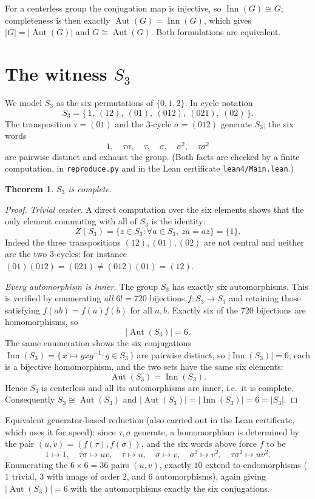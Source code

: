 \documentclass[11pt]{article}
\newtheorem{theorem}{Theorem}
\theoremstyle{definition}
\theoremstyle{remark}
\newcommand{\Aut}{\operatorname{Aut}}
\newcommand{\Inn}{\operatorname{Inn}}
\newcommand{\Sthree}{S_3}
\begin{document}
For a centerless group the conjugation map is injective, so $\Inn(G) \cong G$;
completeness is then exactly $\Aut(G) = \Inn(G)$, which gives
$|G| = |\Aut(G)|$ and $G \cong \Aut(G)$. Both formulations are equivalent.

\section{The witness $S_3$}

We model $\Sthree$ as the six permutations of $\{0,1,2\}$. In cycle notation
\[
\Sthree = \{\, 1,\ (12),\ (01),\ (012),\ (021),\ (02) \,\}.
\]
The transposition $\tau = (01)$ and the $3$-cycle $\sigma = (012)$ generate
$\Sthree$; the six words
\[
1,\quad \tau\sigma,\quad \tau,\quad \sigma,\quad \sigma^2,\quad \tau\sigma^2
\]
are pairwise distinct and exhaust the group. (Both facts are checked by a finite
computation, in \texttt{reproduce.py} and in the Lean certificate
\texttt{lean4/Main.lean}.)

\begin{theorem}\label{thm:complete}
$\Sthree$ is complete.
\end{theorem}

\begin{proof}
\emph{Trivial center.} A direct computation over the six elements shows that the
only element commuting with all of $\Sthree$ is the identity:
\[
Z(\Sthree) = \{z \in \Sthree : \forall a \in \Sthree,\ za = az\} = \{1\}.
\]
Indeed the three transpositions $(12),(01),(02)$ are not central and neither are
the two $3$-cycles: for instance $(01)(012) = (021) \neq (012)(01) = (12)$.

\emph{Every automorphism is inner.} The group $\Sthree$ has exactly six
automorphisms. This is verified by enumerating \emph{all} $6! = 720$ bijections
$f : \Sthree \to \Sthree$ and retaining those satisfying
$f(ab) = f(a)f(b)$ for all $a,b$. Exactly six of the $720$ bijections are
homomorphisms, so
\[
|\Aut(\Sthree)| = 6 .
\]
The same enumeration shows the six conjugations
$\Inn(\Sthree) = \{\, x \mapsto gxg^{-1} : g \in \Sthree \,\}$ are pairwise
distinct, so $|\Inn(\Sthree)| = 6$; each is a bijective homomorphism, and the two
sets have the same six elements:
\[
\Aut(\Sthree) = \Inn(\Sthree).
\]
Hence $\Sthree$ is centerless and all its automorphisms are inner, i.e.\ it is
complete. Consequently $\Sthree \cong \Aut(\Sthree)$ and
$|\Aut(\Sthree)| = |\Inn(\Sthree)| = 6 = |\Sthree|$.
\end{proof}

Equivalent generator-based reduction (also carried out in the Lean certificate,
which uses it for speed): since $\tau,\sigma$ generate, a homomorphism is
determined by the pair $(u,v) = (f(\tau), f(\sigma))$, and the six words above
force $f$ to be
\[
1 \mapsto 1,\quad \tau\sigma \mapsto uv,\quad \tau \mapsto u,\quad
\sigma \mapsto v,\quad \sigma^2 \mapsto v^2,\quad \tau\sigma^2 \mapsto uv^2 .
\]
Enumerating the $6 \times 6 = 36$ pairs $(u,v)$, exactly $10$ extend to
endomorphisms ($1$ trivial, $3$ with image of order $2$, and $6$ automorphisms),
again giving $|\Aut(\Sthree)| = 6$ with the automorphisms exactly the six
conjugations.
\end{document}
